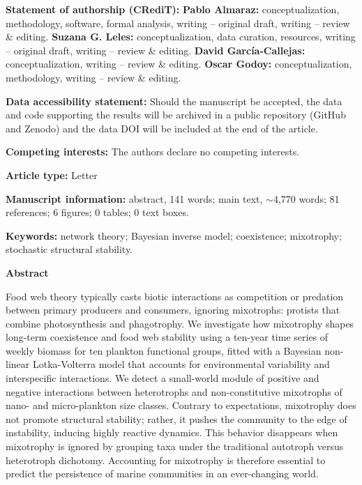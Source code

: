 \documentclass[12pt]{article}
\begin{document}
\begin{flushleft}
\vspace{1.5em}
\textbf{Statement of authorship (CRediT):} \textbf{Pablo Almaraz:} conceptualization, methodology, software, formal analysis, writing -- original draft, writing -- review \& editing. \textbf{Suzana G. Leles:} conceptualization, data curation, resources, writing -- original draft, writing -- review \& editing. \textbf{David Garc\'{i}a-Callejas:} conceptualization, writing -- review \& editing. \textbf{Oscar Godoy:} conceptualization, methodology, writing -- review \& editing.

\vspace{1em}
\textbf{Data accessibility statement:} Should the manuscript be accepted, the data and code supporting the results will be archived in a public repository (GitHub and Zenodo) and the data DOI will be included at the end of the article.

\vspace{1em}
\textbf{Competing interests:} The authors declare no competing interests.

\vspace{1em}
\textbf{Article type:} Letter

\vspace{1em}
\textbf{Manuscript information:} abstract, 141 words; main text, $\sim$4{,}770 words; 81 references; 6 figures; 0 tables; 0 text boxes.

\vspace{1em}
\textbf{Keywords:} network theory; Bayesian inverse model; coexistence; mixotrophy; stochastic structural stability.

\end{flushleft}

\clearpage

\begin{center}\textbf{\large Abstract}\end{center}

\noindent Food web theory typically casts biotic interactions as competition or predation between primary producers and consumers, ignoring mixotrophs: protists that combine photosynthesis and phagotrophy. We investigate how mixotrophy shapes long-term coexistence and food web stability using a ten-year time series of weekly biomass for ten plankton functional groups, fitted with a Bayesian non-linear Lotka-Volterra model that accounts for environmental variability and interspecific interactions. We detect a small-world module of positive and negative interactions between heterotrophs and non-constitutive mixotrophs of nano- and micro-plankton size classes. Contrary to expectations, mixotrophy does not promote structural stability; rather, it pushes the community to the edge of instability, inducing highly reactive dynamics. This behavior disappears when mixotrophy is ignored by grouping taxa under the traditional autotroph versus heterotroph dichotomy. Accounting for mixotrophy is therefore essential to predict the persistence of marine communities in an ever-changing world.
\end{document}

